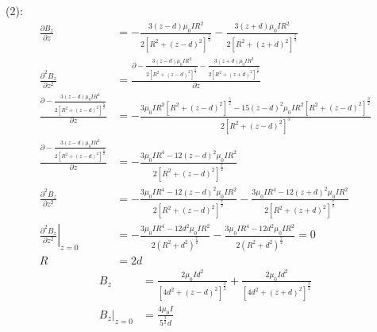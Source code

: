 (2):
\begin{align*}
    \frac{\partial B_z}{\partial z}
    &=-
    \frac{3\left(z-d\right)\mu_0 IR^2}{2 \left[R^2+\left(z-d\right)^2\right]^\frac{5}{2}}-\frac{3\left(z+d\right)\mu_0 IR^2}{2 \left[R^2+\left(z+d\right)^2\right]^\frac{5}{2}}\\
    \frac{\partial^2 B_z}{\partial z^2}
    &=\frac{\partial -
    \frac{3\left(z-d\right)\mu_0 IR^2}{2 \left[R^2+\left(z-d\right)^2\right]^\frac{5}{2}}-\frac{3\left(z+d\right)\mu_0 IR^2}{2 \left[R^2+\left(z+d\right)^2\right]^\frac{5}{2}}}{\partial z}\\
    \frac{\partial -
    \frac{3\left(z-d\right)\mu_0 IR^2}{2 \left[R^2+\left(z-d\right)^2\right]^\frac{5}{2}}}{\partial z}
    &=-
    \frac{3\mu_0 IR^2\left[R^2+\left(z-d\right)^2\right]^\frac{5}{2}
    -15\left(z-d\right)^2\mu_0 IR^2\left[R^2+\left(z-d\right)^2\right]^\frac{3}{2}}{2 \left[R^2+\left(z-d\right)^2\right]^5}\\
\frac{\partial -
    \frac{3\left(z-d\right)\mu_0 IR^2}{2 \left[R^2+\left(z-d\right)^2\right]^\frac{5}{2}}}{\partial z}
    &=-
    \frac{3\mu_0 IR^4
    -12\left(z-d\right)^2\mu_0 IR^2}{2 \left[R^2+\left(z-d\right)^2\right]^\frac{7}{2}}\\
    \frac{\partial^2 B_z}{\partial z^2}
    &=-
    \frac{3\mu_0 IR^4
    -12\left(z-d\right)^2\mu_0 IR^2}{2 \left[R^2+\left(z-d\right)^2\right]^\frac{7}{2}}
    -
    \frac{3\mu_0 IR^4
    -12\left(z+d\right)^2\mu_0 IR^2}{2 \left[R^2+\left(z+d\right)^2\right]^\frac{7}{2}}\\
    \left.\frac{\partial^2 B_z}{\partial z^2}\right|_{z=0}
    &=-
    \frac{3\mu_0 IR^4
    -12d^2\mu_0 IR^2}{2 \left(R^2+d^2\right)^\frac{7}{2}}
    -
    \frac{3\mu_0 IR^4
    -12d^2\mu_0 IR^2}{2 \left(R^2+d^2\right)^\frac{7}{2}}=0\\
    R
    &=2d
\end{align*}
\begin{align*}
    B_z&=\frac{2\mu_0 Id^2}{\left[4d^2+\left(z-d\right)^2\right]^\frac{3}{2}}+\frac{2\mu_0 Id^2}{\left[4d^2+\left(z+d\right)^2\right]^\frac{3}{2}}\\
    \left.B_z\right|_{z=0}&=\frac{4\mu_0 I}{5^\frac{3}{2}d}
\end{align*}
